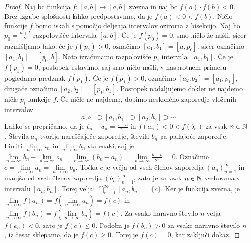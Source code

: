 \documentclass[../TG_magistrsko_delo_sections.tex]{subfiles}
\begin{document}
\begin{proof}
Naj bo funkcija $f \colon [a, b] \to [a, b]$ zvezna in naj bo $f(a)\cdot f(b) < 0$. Brez izgube splošnosti lahko predpostavimo, da je $f(a) < 0 < f(b)$. Ničlo funkcije $f$ bomo iskali s pomočjo deljenja intervalov oziroma z bisekcijo. Naj bo $p_0=\frac{a+b}{2}$ razpolovišče intervala $[a, b]$. Če je $f(p_0)=0$, smo ničlo že našli, sicer razmišljamo tako: če je $f(p_0) >0$, označimo $[a_1, b_1] =  [a, p_0]$, sicer označimo $[a_1, b_1] =  [p_0, b]$. Nato izračunamo razpolovišče $p_1$ intervala $[a_1, b_1]$. Če je $f(p_1)=0$, postopek ustavimo, saj smo ničlo našli, v nasprotnem primeru pogledamo predznak $f(p_1)$. Če je $f(p_1) >0$, označimo $[a_2, b_2] =  [a_1, p_1]$, drugače označimo $[a_2, b_2] =  [p_1, b_1]$. Postopek nadaljujemo dokler ne najdemo ničle $p_i$ funkcije $f$. Če ničle ne najdemo, dobimo neskončno zaporedje vloženih intervalov 
$$ [a, b] \supset [a_1, b_1] \supset [a_2, b_2] \supset \cdots$$
Lahko se prepričamo, da je $b_n - a_n = \frac{b-a}{2^n}$ in $f(a_n)<0<f(b_n)$ za vsak $n\in \mathbb N$. Števila $a_n$ tvorijo naraščajoče zaporedje, števila $b_n$ pa padajoče zaporedje.  Limiti $\lim\limits_{n \to \infty} a_n$ in $\lim\limits_{n \to \infty} b_n$ sta enaki, saj je 
$\lim\limits_{n \to \infty} b_n - \lim\limits_{n \to \infty} a_n = \lim\limits_{n \to \infty} (b_n - a_n) = \lim\limits_{n \to \infty} \frac{b - a}{2^n} = 0$. Označimo $c = \lim\limits_{n \to \infty} a_n = \lim\limits_{n \to \infty} b_n$. Točka $c$ je večja od vseh členov zaporedja $\left(a_n \right)_{n=1}^{\infty}$ in manjša od vseh členov zaporedja $\left(b_n \right)_{n=1}^{\infty}$, zato je za vsak $n \in \mathbb N$ vsebovana v intervalu $[a_n, b_n]$. Torej velja:
$\bigcap\limits_{n=1}^{\infty} [a_n, b_n] = \{c\}$. 
Ker je funkcija zvezna, je 
$\lim\limits_{n \to \infty} f(a_n) = f\left(\lim\limits_{n \to \infty} a_n\right) = f(c)$
in 
$\lim\limits_{n \to \infty} f(b_n) = f\left(\lim\limits_{n \to \infty} b_n\right) = f(c)$.
Za vsako naravno število $n$ velja $f(a_n) <0$, zato je $f(c) \leq 0$. Podobn je $f(b_n) > 0$ za vsako naravno število $n$, iz česar sklepamo, da je $f(c) \geq 0$. Torej je $f(c) = 0$, kar zaključi dokaz.
\end{proof}
\end{document}
